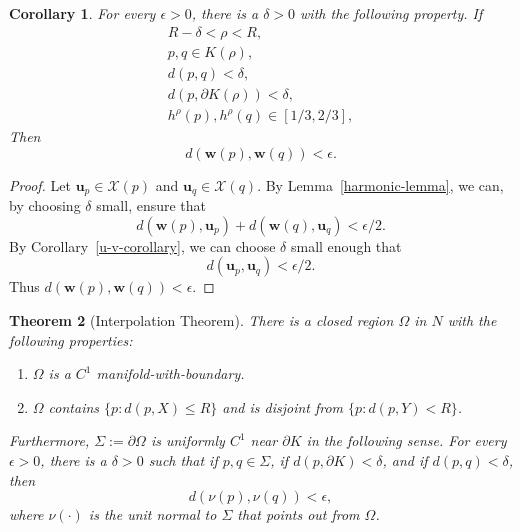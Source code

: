 \documentclass{amsart}
\newcommand{\eps}{\epsilon}
\newcommand{\Xx}{\mathcal{X}}
\newcommand{\ww}{\mathbf w}
\newcommand{\uu}{\mathbf{u}}
\newtheorem{theorem}    {Theorem}   %
\newtheorem{corollary}  [theorem]     {Corollary}
\theoremstyle{definition}
\theoremstyle{definition}
\begin{document}
\begin{corollary}\label{harmonic-corollary}
For every $\eps>0$, there is a $\delta>0$ with the following property.
If 
\begin{gather*}
R-\delta < \rho < R, \\
p,q\in K(\rho), \\
d(p,q)<\delta, \\
d(p,\partial K(\rho)) < \delta, \\
h^\rho(p), h^\rho(q)  \in [1/3, 2/3],
\end{gather*}
Then 
\[
    d(\ww(p),\ww(q)) < \eps.
\]
\end{corollary}

\begin{proof}
Let $\uu_p\in \Xx(p)$ and $\uu_q\in \Xx(q)$.
By Lemma~\ref{harmonic-lemma}, we can, by choosing $\delta$ small, ensure that
\[
  d(\ww(p),\uu_p) + d(\ww(q),\uu_q) < \eps/2.
\]
By Corollary~\ref{u-v-corollary}, we can choose $\delta$ small enough that
\[
   d(\uu_p, \uu_q) < \eps/2.
\]
Thus $d(\ww(p),\ww(q))<\eps$.
\end{proof}






\begin{theorem}[Interpolation Theorem]\label{interpolation-theorem}
There is a closed region $\Omega$ in $N$ with the following properties:
\begin{enumerate}
\item $\Omega$ is a $C^1$ manifold-with-boundary.
\item $\Omega$ contains $\{p: d(p,X)\le R\}$ and is disjoint from $\{p: d(p,Y)<R\}$.
\end{enumerate}
Furthermore,  $\Sigma:=\partial\Omega$ is uniformly $C^1$ near $\partial K$ in the following sense.
For every $\eps>0$, there is a $\delta>0$ such that if $p,q\in \Sigma$, if $d(p,\partial K)<\delta$,
 and  if $d(p,q)<\delta$, then 
\[
   d(\nu(p),\nu(q))< \eps,
\]
where $\nu(\cdot)$ is the unit normal to $\Sigma$ that points out from $\Omega$.
\end{theorem}
\end{document}
